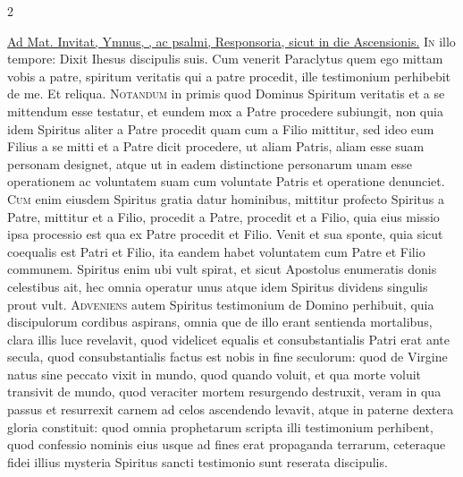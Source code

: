 \begin{multicols*}{2}
\begin{responsory-final}
\end{responsory-final}%
{\color{Red} }
\newline \ul{Ad Mat. Invitat, Ymnus, \Vbar , ac psalmi, Responsoria, sicut in die Ascensionis.}
\lettrine[lines=2]{\zallmancaps \color{Red} I}{n} illo tempore: Dixit Ihesus discipulis suis. Cum venerit Paraclytus quem ego mittam vobis a patre, spiritum veritatis qui a patre procedit, ille testimonium perhibebit de me. Et reliqua.
 \grecross
\lettrine[lines=2]{\zallmancaps \color{Blue} N}{otandum} in primis quod Dominus Spiritum veritatis et a se mittendum esse testatur, et eundem mox a Patre procedere subiungit, non quia idem Spiritus aliter a Patre procedit quam cum a Filio mittitur, sed ideo eum Filius a se mitti et a Patre dicit procedere, ut aliam Patris, aliam esse suam personam designet, atque ut in eadem distinctione personarum unam esse operationem ac voluntatem suam cum voluntate Patris et operatione denunciet.
\lettrine[lines=2]{\zallmancaps \color{Red} C}{um} enim eiusdem Spiritus gratia datur hominibus, mittitur profecto Spiritus a Patre, mittitur et a Filio, procedit a Patre, procedit et a Filio, quia eius missio ipsa processio est qua ex Patre procedit et Filio. Venit et sua sponte, quia sicut coequalis est Patri et Filio, ita eandem habet voluntatem cum Patre et Filio communem. Spiritus enim ubi vult spirat, et sicut Apostolus enumeratis donis celestibus ait, hec omnia operatur unus atque idem Spiritus dividens singulis prout vult.
\lettrine[lines=2]{\zallmancaps \color{Blue} A}{dveniens} autem Spiritus testimonium de Domino perhibuit, quia discipulorum cordibus aspirans, omnia que de illo erant sentienda mortalibus, clara illis luce revelavit, quod videlicet equalis et consubstantialis Patri erat ante secula, quod consubstantialis factus est nobis in fine seculorum: quod de
Virgine natus sine peccato vixit in mundo, quod quando voluit, et qua morte voluit transivit de mundo, quod veraciter mortem resurgendo destruxit, veram in qua passus et resurrexit carnem ad celos ascendendo levavit, atque in paterne dextera gloria constituit: quod omnia prophetarum scripta illi testimonium perhibent, quod confessio nominis eius usque ad fines erat propaganda terrarum, ceteraque fidei illius mysteria Spiritus sancti testimonio sunt reserata discipulis.

\end{multicols*}
